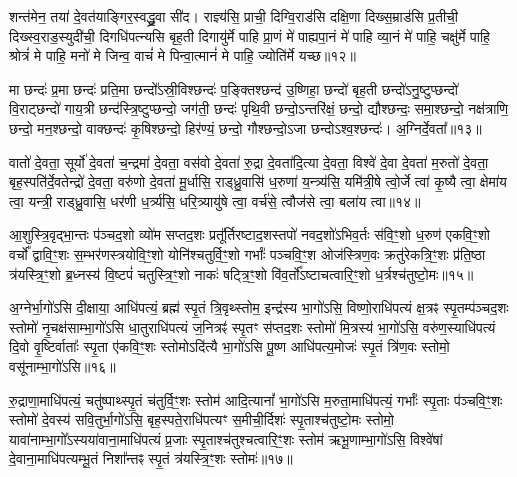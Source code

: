 शन्त॑मेन॒ तया॑ दे॒वत॑याङ्गिर॒स्वद्ध्रु॒वा सी॑द। राज्ञ्य॑सि॒ प्राची॒ दिग्वि॒राड॑सि दक्षि॒णा दिख्स॒म्राड॑सि प्र॒तीची॒ दिख्स्व॒राड॒स्युदी॑ची॒ दिगधि॑पत्न्यसि बृह॒ती दिगायु॑र्मे पाहि प्रा॒णं मे॑ पाह्यपा॒नं मे॑ पाहि व्या॒नं मे॑ पाहि॒ चक्षु॑र्मे पाहि॒ श्रोत्रं॑ मे पाहि॒ मनो॑ मे जिन्व॒ वाचं॑ मे पिन्वा॒त्मानं॑ मे पाहि॒ ज्योति॑र्मे यच्छ॥१२॥

{\anuvakamend[{छ॒र्दिषा॑ पिन्व॒ षट्च॑॥६॥}]}

मा छन्दः॑ प्र॒मा छन्दः॑ प्रति॒मा छन्दो᳚\-ऽस्री॒विश्छन्दः॑ प॒ङ्क्तिश्छन्द॑ उ॒ष्णिहा॒ छन्दो॑ बृह॒ती छन्दो॑\-ऽनु॒ष्टुप्छन्दो॑ वि॒राट्छन्दो॑ गाय॒त्री छन्द॑स्त्रि॒ष्टुप्छन्दो॒ जग॑ती॒ छन्दः॑ पृथि॒वी छन्दो॒\-ऽन्तरि॑क्षं॒ छन्दो॒ द्यौश्छन्दः॒ समा॒श्छन्दो॒ नक्ष॑त्राणि॒ छन्दो॒ मन॒श्छन्दो॒ वाक्छन्दः॑ कृ॒षिश्छन्दो॒ हिर॑ण्यं॒ छन्दो॒ गौश्छन्दो॒\-ऽजा छन्दो\-ऽश्व॒श्छन्दः॑। अ॒ग्निर्दे॒वता᳚॥१३॥

वातो॑ दे॒वता॒ सूर्यो॑ दे॒वता॑ च॒न्द्रमा॑ दे॒वता॒ वस॑वो दे॒वता॑ रु॒द्रा दे॒वता॑दि॒त्या दे॒वता॒ विश्वे॑ दे॒वा दे॒वता॑ म॒रुतो॑ दे॒वता॒ बृह॒स्पति॑र्दे॒वतेन्द्रो॑ दे॒वता॒ वरु॑णो दे॒वता॑ मू॒र्धासि॒ राड्ध्रु॒वासि॑ ध॒रुणा॑ य॒न्त्र्य॑सि॒ यमि॑त्री॒षे त्वो॒र्जे त्वा॑ कृ॒ष्यै त्वा॒ क्षेमा॑य त्वा॒ यन्त्री॒ राड्ध्रु॒वासि॒ धर॑णी ध॒र्त्र्य॑सि॒ धरि॒त्र्यायु॑षे त्वा॒ वर्च॑से॒ त्वौज॑से त्वा॒ बला॑य त्वा॥१४॥

{\anuvakamend[{दे॒वता\-ऽ\-ऽयु॑षे त्वा॒ षट्च॑॥७॥}]}

आ॒शुस्त्रि॒वृद्भा॒न्तः प॑ञ्चद॒शो व्यो॑म सप्तद॒शः प्रतू᳚र्तिरष्टाद॒शस्तपो॑ नवद॒शो॑\-ऽभिव॒र्तः स॑वि॒ꣳ॒शो ध॒रुण॑ एकवि॒ꣳ॒शो वर्चो᳚ द्वावि॒ꣳ॒शः स॒म्भर॑णस्त्रयोवि॒ꣳ॒शो योनि॑श्चतुर्वि॒ꣳ॒शो गर्भाः᳚ पञ्चवि॒ꣳ॒श ओज॑स्त्रिण॒वः क्रतु॑रेकत्रि॒ꣳ॒शः प्र॑ति॒ष्ठा त्र॑यस्त्रि॒ꣳ॒शो ब्र॒ध्नस्य॑ वि॒ष्टपं॑ चतुस्त्रि॒ꣳ॒शो नाकः॑ षट्त्रि॒ꣳ॒शो वि॑व॒र्तो᳚\-ऽष्टाचत्वारि॒ꣳ॒शो ध॒र्त्रश्च॑तुष्टो॒मः॥१५॥

{\anuvakamend[{आ॒शुः स॒प्तत्रिꣳ॑शत्॥८॥}]}

अ॒ग्नेर्भा॒गो॑\-ऽसि दी॒क्षाया॒ आधि॑पत्यं॒ ब्रह्म॑ स्पृ॒तं त्रि॒वृथ्स्तोम॒ इन्द्र॑स्य भा॒गो॑\-ऽसि॒ विष्णो॒राधि॑पत्यं क्ष॒त्रꣴ स्पृ॒तम्प॑ञ्चद॒शः स्तोमो॑ नृ॒चक्ष॑साम्भा॒गो॑\-ऽसि धा॒तुराधि॑पत्यं ज॒नित्रꣴ॑ स्पृ॒तꣳ स॑प्तद॒शः स्तोमो॑ मि॒त्रस्य॑ भा॒गो॑\-ऽसि॒ वरु॑ण॒स्याधि॑पत्यं दि॒वो वृ॒ष्टिर्वाताः᳚ स्पृ॒ता ए॑कवि॒ꣳ॒शः स्तोमो\-ऽदि॑त्यै भा॒गो॑\-ऽसि पू॒ष्ण आधि॑पत्य॒मोजः॑ स्पृ॒तं त्रि॑ण॒वः स्तोमो॒ वसू॑नाम्भा॒गो॑\-ऽसि॥१६॥

रु॒द्राणा॒माधि॑पत्यं॒ चतु॑ष्पाथ्स्पृ॒तं च॑तुर्वि॒ꣳ॒शः स्तोम॑ आदि॒त्यानां᳚ भा॒गो॑\-ऽसि म॒रुता॒माधि॑पत्यं॒ गर्भाः᳚ स्पृ॒ताः प॑ञ्चवि॒ꣳ॒शः स्तोमो॑ दे॒वस्य॑ सवि॒तुर्भा॒गो॑\-ऽसि॒ बृह॒स्पते॒राधि॑पत्यꣳ स॒मीची॒र्दिशः॑ स्पृ॒ताश्च॑तुष्टो॒मः स्तोमो॒ यावा॑नाम्भा॒गो᳚\-ऽस्यया॑वाना॒माधि॑पत्यं प्र॒जाः स्पृ॒ताश्च॑तुश्चत्वारि॒ꣳ॒शः स्तोम॑ ऋभू॒णाम्भा॒गो॑\-ऽसि॒ विश्वे॑षां दे॒वाना॒माधि॑पत्यम्भू॒तं निशा᳚न्तꣴ स्पृ॒तं त्र॑यस्त्रि॒ꣳ॒शः स्तोमः॑॥१७॥

